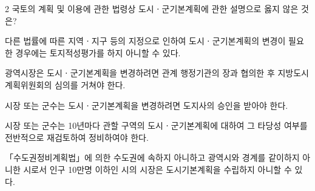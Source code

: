 \begin{question}{2}
국토의 계획 및 이용에 관한 법령상 도시ㆍ군기본계획에 관한 설명으로 옳지 않은 것은?
\begin{choices}
  \item 다른 법률에 따른 지역ㆍ지구 등의 지정으로 인하여 도시ㆍ군기본계획의 변경이 필요한 경우에는 토지적성평가를 하지 아니할 수 있다.
  \item 광역시장은 도시ㆍ군기본계획을 변경하려면 관계 행정기관의 장과 협의한 후 지방도시계획위원회의 심의를 거쳐야 한다.
  \item 시장 또는 군수는 도시ㆍ군기본계획을 변경하려면 도지사의 승인을 받아야 한다.
  \item 시장 또는 군수는 10년마다 관할 구역의 도시ㆍ군기본계획에 대하여 그 타당성 여부를 전반적으로 재검토하여 정비하여야 한다.
  \item 「수도권정비계획법」에 의한 수도권에 속하지 아니하고 광역시와 경계를 같이하지 아니한 시로서 인구 10만명 이하인 시의 시장은 도시기본계획을 수립하지 아니할 수 있다.
\end{choices}
\end{question}
